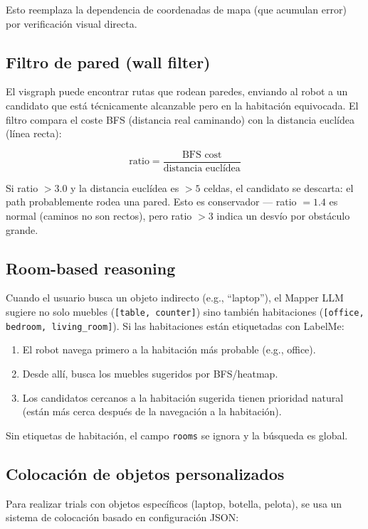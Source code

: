 \documentclass[11pt,a4paper]{article}
\begin{document}
Esto reemplaza la dependencia de coordenadas de mapa (que acumulan error) por verificación visual directa.

\subsection{Filtro de pared (wall filter)}

El visgraph puede encontrar rutas que rodean paredes, enviando al robot a un candidato que está técnicamente alcanzable pero en la habitación equivocada. El filtro compara el coste BFS (distancia real caminando) con la distancia euclídea (línea recta):

$$\text{ratio} = \frac{\text{BFS cost}}{\text{distancia euclídea}}$$

Si ratio $> 3.0$ y la distancia euclídea es $> 5$ celdas, el candidato se descarta: el path probablemente rodea una pared. Esto es conservador --- ratio $= 1.4$ es normal (caminos no son rectos), pero ratio $> 3$ indica un desvío por obstáculo grande.

\subsection{Room-based reasoning}

Cuando el usuario busca un objeto indirecto (e.g., ``laptop''), el Mapper LLM sugiere no solo muebles (\texttt{[table, counter]}) sino también habitaciones (\texttt{[office, bedroom, living\_room]}). Si las habitaciones están etiquetadas con LabelMe:

\begin{enumerate}
    \item El robot navega primero a la habitación más probable (e.g., office).
    \item Desde allí, busca los muebles sugeridos por BFS/heatmap.
    \item Los candidatos cercanos a la habitación sugerida tienen prioridad natural (están más cerca después de la navegación a la habitación).
\end{enumerate}

Sin etiquetas de habitación, el campo \texttt{rooms} se ignora y la búsqueda es global.

\subsection{Colocación de objetos personalizados}

Para realizar trials con objetos específicos (laptop, botella, pelota), se usa un sistema de colocación basado en configuración JSON:
\end{document}

